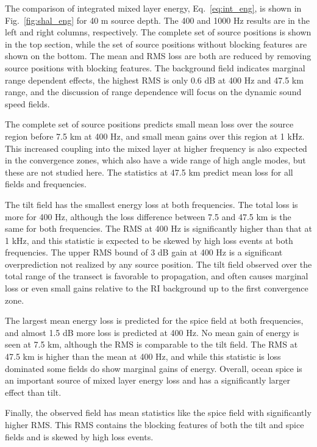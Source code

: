 \documentclass[preprint,NumberedRefs]{JASA}
\begin{document}
The comparison of integrated mixed layer energy, Eq.~\eqref{eq:int_eng}, is shown in Fig.~\ref{fig:shal_eng} for 40 m source depth. The 400 and 1000 Hz results are in the left and right columns, respectively. The complete set of source positions is shown in the top section, while the set of source positions without blocking features are shown on the bottom. The mean and RMS loss are both are reduced by removing source positions with blocking features. The background field indicates marginal range dependent effects, the highest RMS is only 0.6 dB at 400 Hz and 47.5 km range, and the discussion of range dependence will focus on the dynamic sound speed fields.

The complete set of source positions predicts small mean loss over the source region before 7.5 km at 400 Hz, and small mean gains over this region at 1 kHz. This increased coupling into the mixed layer at higher frequency is also expected in the convergence zones, which also have a wide range of high angle modes, but these are not studied here. The statistics at 47.5 km predict mean loss for all fields and frequencies.

The tilt field has the smallest energy loss at both frequencies. The total loss is more for 400 Hz, although the loss difference between 7.5 and 47.5 km is the same for both frequencies. The RMS at 400 Hz is significantly higher than that at 1 kHz, and this statistic is expected to be skewed by high loss events at both frequencies. The upper RMS bound of 3 dB gain at 400 Hz is a significant overprediction not realized by any source position. The tilt field observed over the total range of the transect is favorable to propagation, and often causes marginal loss or even small gains relative to the RI background up to the first convergence zone.

The largest mean energy loss is predicted for the spice field at both frequencies, and almost 1.5 dB more loss is predicted at 400 Hz. No mean gain of energy is seen at 7.5 km, although the RMS is comparable to the tilt field. The RMS at 47.5 km is higher than the mean at 400 Hz, and while this statistic is loss dominated some fields do show marginal gains of energy. Overall, ocean spice is an important source of mixed layer energy loss and has a significantly larger effect than tilt.

Finally, the observed field has mean statistics like the spice field with significantly higher RMS. This RMS contains the blocking features of both the tilt and spice fields and is skewed by high loss events.
\end{document}
